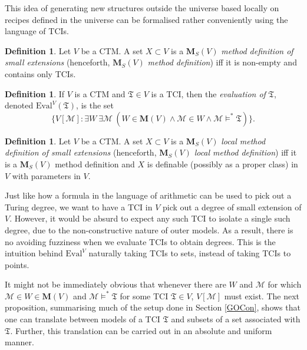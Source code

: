 \documentclass[12pt, twoside]{memoir}
\numberwithin{equation}{section}
\theoremstyle{definition}
\newtheorem{defi}[thm]{Definition}
\theoremstyle{remark}
\theoremstyle{definition}
\theoremstyle{definition}
\theoremstyle{definition}
\theoremstyle{remark}
\begin{document}
This idea of generating new structures outside the universe based locally on recipes defined in the universe can be formalised rather conveniently using the language of TCIs. 

\begin{defi}\label{def320}
Let $V$ be a CTM. A set $X \subset V$ is a $\mathbf{M}_S(V)$ \emph{method definition of small extensions} (henceforth, $\mathbf{M}_S(V)$ \emph{method definition}) iff it is non-empty and contains only TCIs.
\end{defi}

\begin{defi}\label{def323}
If $V$ is a CTM and $\mathfrak{T} \in V$ is a TCI, then the \emph{evaluation of} $\mathfrak{T}$, denoted $\mathrm{Eval}^V(\mathfrak{T})$, is the set
\begin{equation*}
    \{V[\mathcal{M}] : \exists W \ \exists \mathcal{M} \ (W \in \mathbf{M}(V) \wedge \mathcal{M} \in W \wedge \mathcal{M} \models^* \mathfrak{T})\} \text{.}
\end{equation*}
\end{defi}

\begin{defi}
Let $V$ be a CTM. A set $X \subset V$ is a $\mathbf{M}_S(V)$ \emph{local method definition of small extensions} (henceforth, $\mathbf{M}_S(V)$ \emph{local method definition}) iff it is a $\mathbf{M}_S(V)$ method definition and $X$ is definable (possibly as a proper class) in $V$ with parameters in $V$. 
\end{defi}

Just like how a formula in the language of arithmetic can be used to pick out a Turing degree, we want to have a TCI in $V$ pick out a degree of small extension of $V$. However, it would be absurd to expect any such TCI to isolate a single such degree, due to the non-constructive nature of outer models. As a result, there is no avoiding fuzziness when we evaluate TCIs to obtain degrees. This is the intuition behind $\mathrm{Eval}^V$ naturally taking TCIs to sets, instead of taking TCIs to points.

It might not be immediately obvious that whenever there are $W$ and $\mathcal{M}$ for which $\mathcal{M} \in W \in \mathbf{M}(V)$ and $\mathcal{M} \models^* \mathfrak{T}$ for some TCI $\mathfrak{T} \in V$, $V[\mathcal{M}]$ must exist. The next proposition, summarising much of the setup done in Section \ref{GOCon}, shows that one can translate between models of a TCI $\mathfrak{T}$ and subsets of a set associated with $\mathfrak{T}$. Further, this translation can be carried out in an absolute and uniform manner.
\end{document}
